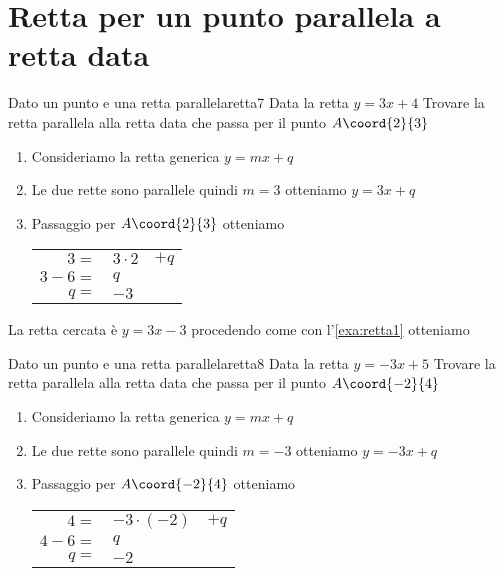 \section{Retta per un punto parallela a retta data}
\begin{esempiot}{Dato un punto e una retta parallela}{retta7}
	Data la retta $y=3x+4$ Trovare la retta parallela alla retta data che  passa per il punto	$A\coord{2}{3}$
\end{esempiot}
\begin{enumerate}
	\item Consideriamo la retta generica $y=mx+q$
	\item Le due rette sono parallele quindi $m=3$ otteniamo $y=3x+q$
	\item Passaggio per $A\coord{2}{3}$ otteniamo 
	\begin{tabular}{rll}
	$3=$&$3\cdot 2$&$+q$\\
	$3-6=$&$q$\\
	$q=$&$-3$\\
	\end{tabular}
\end{enumerate}

La retta cercata è $y=3x-3$ procedendo come con l'\cref{exa:retta1}
otteniamo
\begin{center}
	
	\label{fig:disegnoretta7}
\end{center}
\begin{esempiot}{Dato un punto e una retta parallela}{retta8}
	Data la retta $y=-3x+5$ Trovare la retta parallela alla retta data che  passa per il punto	$A\coord{-2}{4}$
\end{esempiot}
\begin{enumerate}
	\item Consideriamo la retta generica $y=mx+q$
	\item Le due rette sono parallele quindi $m=-3$ otteniamo $y=-3x+q$
	\item Passaggio per $A\coord{-2}{4}$ otteniamo 
	\begin{tabular}{rll}
		$4=$&$-3\cdot (-2)$&$+q$\\
		$4-6=$&$q$\\
		$q=$&$-2$\\
	\end{tabular}
\end{enumerate}


